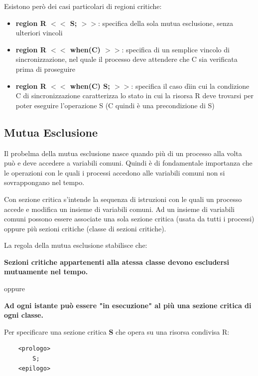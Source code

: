 \documentclass{article}
\begin{document}
Esistono però dei casi particolari di regioni critiche:
\begin{itemize}
    \item \textbf{region R $<<$ S; $>>$}: specifica della sola mutua esclusione, senza ulteriori vincoli
    \item \textbf{region R $<<$ when(C) $>>$}: specifica di un semplice vincolo di sincronizzazione, nel quale il processo deve attendere che C sia verificata prima di proseguire
    \item \textbf{region R $<<$ when(C) S; $>>$}: specifica il caso dìin cui la condizione C di sincronizzazione caratterizza lo stato in cui la risorsa R deve trovarsi per poter
    eseguire l'operazione S (C quindi è una precondizione di S)
\end{itemize}

\subsection{Mutua Esclusione}

Il probelma della mutua esclusione nasce quando più di un processo alla volta può e deve accedere a variabili comuni. Quindi è di fondamentale importanza che le operazioni con le quali
i processi accedono alle variabili comuni non si sovrappongano nel tempo.

\vspace{3mm}
Con sezione critica s'intende la sequenza di istruzioni con le quali un processo accede e modifica un insieme di variabili comuni. Ad un insieme di variabili comuni possono
essere associate una sola sezione critica (usata da tutti i processi) oppure più sezioni critiche (classe di sezioni critiche).

La regola della mutua esclusione stabilisce che:
\begin{center}
    \textbf{Sezioni critiche appartenenti alla atessa classe devono escludersi mutuamente nel tempo.}
    \vspace{3mm}

    oppure

    \vspace{3mm}
    \textbf{Ad ogni istante può essere "in esecuzione" al più una sezione critica di ogni classe.}
\end{center}

\vspace{3mm}
Per specificare una sezione critica \textbf{S} che opera su una risorsa condivisa R:

\begin{lstlisting}
    <prologo>
        S;
    <epilogo>
\end{lstlisting}
\end{document}
